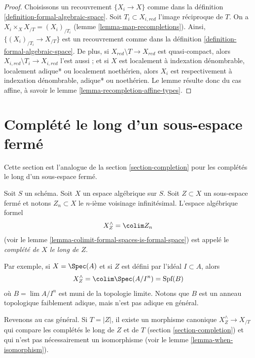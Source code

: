 \begin{proof}
Choisissons un recouvrement $\{X_i \to X\}$ comme dans la
définition \ref{definition-formal-algebraic-space}.
Soit $T_i \subset X_{i, red}$ l'image réciproque de $T$.
On a $X_i \times_X X_{/T} = (X_i)_{/T_i}$
(lemme \ref{lemma-map-recompletions}).
Ainsi, $\{(X_i)_{/T_i} \to X_{/T}\}$ est un recouvrement comme dans la
définition \ref{definition-formal-algebraic-space}.
De plus, si $X_{red} \setminus T \to X_{red}$ est quasi-compact, alors
$X_{i, red} \setminus T_i \to X_{i, red}$ l'est aussi ;
et si $X$ est localement à indexation dénombrable, localement adique* ou
localement noethérien, alors $X_i$ est respectivement à indexation dénombrable, adique*
ou noethérien. Le lemme résulte donc du cas affine, à savoir le
lemme \ref{lemma-recompletion-affine-types}.
\end{proof}








\section{Complété le long d'un sous-espace fermé}
\label{section-completion-subspace}

\noindent
Cette section est l'analogue de la section \ref{section-completion}
pour les complétés le long d'un sous-espace fermé.

\begin{definition}
\label{definition-completion-subspace}
Soit $S$ un schéma. Soit $X$ un espace algébrique sur $S$.
Soit $Z \subset X$ un sous-espace fermé et notons $Z_n \subset X$
le $n$-ième voisinage infinitésimal. L'espace algébrique formel
$$
X^\wedge_Z = \colim Z_n
$$
(voir le lemme \ref{lemma-colimit-formal-spaces-is-formal-space})
est appelé le {\it complété de $X$ le long de $Z$}.
\end{definition}

\noindent
Par exemple, si $X = \Spec(A)$ et si $Z$ est défini par l'idéal $I \subset A$,
alors
$$
X^\wedge_Z = \colim \Spec(A/I^n) = \text{Spf}(B)
$$
où $B = \lim A/I^n$ est muni de la topologie limite. Notons que $B$ est un
anneau topologique faiblement adique, mais n'est pas adique en général.

\medskip\noindent
Revenons au cas général. Si $T = |Z|$, il existe un morphisme canonique
$X^\wedge_Z \to X_{/T}$ qui compare les complétés le long de $Z$
et de $T$ (section \ref{section-completion}) et qui n'est pas nécessairement un isomorphisme
(voir le lemme \ref{lemma-when-isomorphism}).

